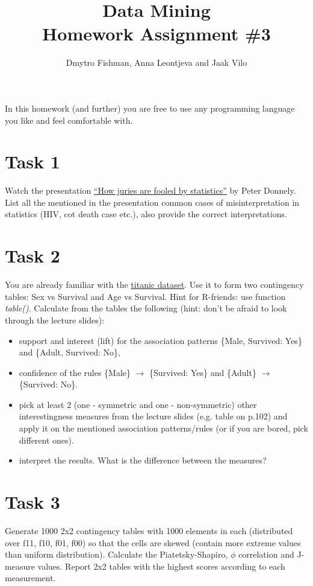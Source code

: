 \documentclass{article}
\title{Data Mining\\Homework Assignment \#3} %
\author{Dmytro Fishman, Anna Leontjeva and Jaak Vilo} %
\begin{document}
\maketitle %

In this homework (and further) you are free to use any programming language you like and feel comfortable with.
\section*{Task 1}
Watch the presentation \href{http://www.ted.com/talks/peter_donnelly_shows_how_stats_fool_juries.html}{``How juries are fooled by statistics''} by Peter Donnely. List all the mentioned in the presentation common cases of misinterpretation in statistics (HIV, cot death case etc.), also provide the correct interpretations.
\section*{Task 2}
You are already familiar with the \href{https://courses.cs.ut.ee/MTAT.03.183/2014_spring/uploads/Main/titanic.txt}{titanic dataset}. Use it to form two contingency tables: Sex vs Survival and Age vs Survival. Hint for R-friends: use function \emph{table()}. Calculate from the tables the following (hint: don't be afraid to look through the lecture slides):
\begin{itemize}
\item support and interest (lift) for the association patterns \{Male, Survived: Yes\} and \{Adult, Survived: No\},
\item confidence of the rules \{Male\} $\rightarrow$ \{Survived: Yes\} and \{Adult\} $\rightarrow$ \{Survived: No\}. 
\item pick at least 2 (one - symmetric and one - non-symmetric) other interestingness measures from the lecture slides (e.g. table on p.102) and apply it on the mentioned association patterns/rules (or if you are bored, pick different ones).
\item interpret the results. What is the difference between the measures?  
\end{itemize} 

\section*{Task 3}
Generate 1000 2x2 contingency tables with 1000 elements in each (distributed over f11, f10, f01, f00) so that the cells are skewed (contain more extreme values than uniform distribution). Calculate the Piatetsky-Shapiro, $\phi$ correlation and J-measure values. Report 2x2 tables with the highest scores according to each measurement.
\end{document}
